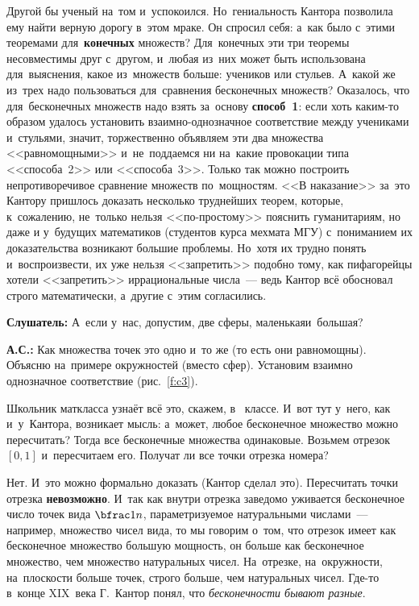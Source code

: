 Другой бы ученый на~том и~успокоился. Но~гениальность Кантора позволила ему найти верную дорогу
в~этом мраке. Он спросил себя: а~как было с~этими теоремами для~\textbf{конечных} множеств? Для~конечных эти
три теоремы несовместимы друг с~другом, и~любая из~них может быть использована для~выяснения, какое
из~множеств больше: учеников или стульев. А~какой же из~трех надо пользоваться для~сравнения
бесконечных множеств? Оказалось, что для~бесконечных множеств надо взять за~основу \textbf{способ~1}: если
хоть каким-то образом удалось установить взаимно-однозначное соответствие между учениками
и~стульями, значит, торжественно объявляем эти два множества <<равномощными>> и~не~поддаемся ни
на~какие провокации типа <<способа~2>> или <<способа~3>>. Только так можно построить
непротиворечивое сравнение множеств по~мощностям. <<В наказание>> за~это Кантору пришлось доказать
несколько труднейших теорем, которые, к~сожалению, не~только нельзя <<по-простому>> пояснить
гуманитариям, но даже и у~будущих математиков
 (студентов  курса мехмата МГУ) с~пониманием их
доказательства возникают большие проблемы. Но~хотя их трудно понять и~воспроизвести, их уже нельзя
<<запретить>> подобно тому, как пифагорейцы хотели <<запретить>> иррациональные числа~--- ведь
Кантор всё обосновал строго математически, а~другие с~этим согласились.

\smallskip

\hrulefill

\medskip

\textbf{Слушатель:} А~если у~нас, допустим, две сферы, маленькая\linebreak и~большая?

\textbf{А.С.:} Как множества точек это одно и~то же (то есть они равномощны). Объясню на~примере окружностей (вместо сфер).
Установим взаимно однозначное соответствие (рис.~\ref{f:c3}).


Школьник маткласса узнаёт всё это, скажем, в~ классе. И~вот тут у~него, как и~у~Кантора,
возникает мысль: а~может, любое бесконечное множество можно пересчитать? Тогда все бесконечные
множества одинаковые. Возьмем отрезок $[0,1]$ и~пересчитаем его. Получат ли все точки отрезка номера?

Нет. И~это можно формально доказать (Кантор сделал это). Пересчитать точки отрезка
\textbf{невозможно}. И~так как внутри отрезка заведомо уживается бесконечное число точек вида $\bfrac 1n$,
параметризуемое натуральными числами~--- например, множество чисел вида, то мы говорим о~том, что
отрезок имеет как бесконечное множество большую мощность, он больше как бесконечное множество, чем
множество натуральных чисел. На~отрезке, на~окружности, на~плоскости больше точек, строго больше,
чем натуральных чисел.
 Где-то в~конце XIX~века Г.~Кантор понял, что \textit{бесконечности бывают разные}.

